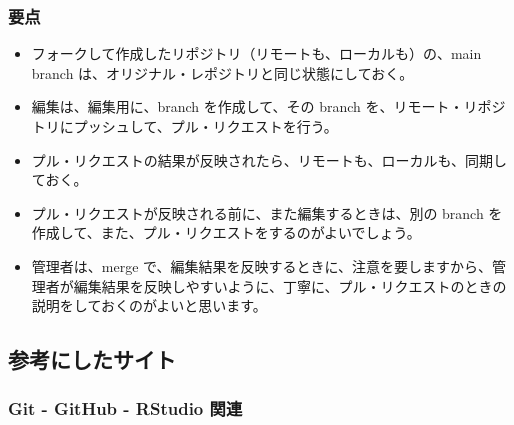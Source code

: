 \documentclass[
  xelatex, ja=standard]{bxjsbook}
\providecommand{\tightlist}{%
  \setlength{\itemsep}{0pt}\setlength{\parskip}{0pt}}
\theoremstyle{definition}
\theoremstyle{definition}
\theoremstyle{definition}
\theoremstyle{definition}
\theoremstyle{remark}
\begin{document}
\hypertarget{ux8981ux70b9}{%
\subsubsection{要点}\label{ux8981ux70b9}}

\begin{itemize}
\tightlist
\item
  フォークして作成したリポジトリ（リモートも、ローカルも）の、main branch は、オリジナル・レポジトリと同じ状態にしておく。
\item
  編集は、編集用に、branch を作成して、その branch を、リモート・リポジトリにプッシュして、プル・リクエストを行う。
\item
  プル・リクエストの結果が反映されたら、リモートも、ローカルも、同期しておく。
\item
  プル・リクエストが反映される前に、また編集するときは、別の branch を作成して、また、プル・リクエストをするのがよいでしょう。
\item
  管理者は、merge で、編集結果を反映するときに、注意を要しますから、管理者が編集結果を反映しやすいように、丁寧に、プル・リクエストのときの説明をしておくのがよいと思います。
\end{itemize}

\hypertarget{ux53c2ux8003ux306bux3057ux305fux30b5ux30a4ux30c8}{%
\subsection{参考にしたサイト}\label{ux53c2ux8003ux306bux3057ux305fux30b5ux30a4ux30c8}}

\hypertarget{git---github---rstudio-ux95a2ux9023}{%
\subsubsection{Git - GitHub - RStudio 関連}\label{git---github---rstudio-ux95a2ux9023}}
\end{document}
